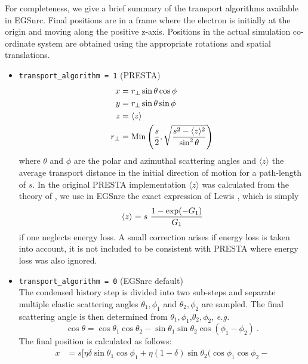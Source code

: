 For completeness, we give a brief summary of the transport
algorithms available in EGSnrc. Final positions are in a frame
where the electron is initially at the origin and moving
along the positive z-axis. Positions in the actual simulation
co-ordinate system are obtained using the appropriate
rotations and spatial translations.
\begin{itemize}
\item
{\tt trans\-port\_algo\-rithm = 1} (PRESTA)
\begin{equation}
\label{PRESTA}
\begin{split}
x &= r_\perp \sin \theta \cos \phi \\
y &= r_\perp \sin \theta \sin \phi \\
z &= \langle z \rangle \\
r_\perp &= \mbox{Min}\left({s \over 2},\sqrt{{s^2 - \langle z \rangle^2 \over
\sin^2 \theta}} \right)
\end{split}
\end{equation}
where $\theta$ and $\phi$ are the polar and azimuthal scattering
angles and $\langle z \rangle$ the average transport distance
in the initial direction of motion for a path-length of $s$.
In the original PRESTA implementation $\langle z \rangle$
was calculated from the theory of \Mol, we use in EGSnrc the
exact expression of Lewis \cite{Le50}, which is simply
\begin{equation}
\langle z \rangle = s~{1 - \exp(-G_1) \over G_1}
\end{equation}
if one neglects energy loss. A small correction arises
if energy loss is taken into account, it is not included
to be consistent with PRESTA where energy loss was also ignored.
\item {\tt trans\-port\_algo\-rithm = 0} (EGSnrc default) \hfill \\
The condensed history step is divided into two sub-steps and
separate multiple elastic scattering angles $\theta_1,\phi_1$ and
$\theta_2,\phi_2$ are sampled. The final scattering angle
is then determined from $\theta_1,\phi_1$,$\theta_2,\phi_2$, {\em e.g.}
\begin{equation}
\cos \theta = \cos \theta_1 \cos \theta_2 - \sin \theta_1 \sin \theta_2
\cos(\phi_1 - \phi_2)~.
\end{equation}
The final position is calculated as follows:
\begin{equation}
\label{egsnrc_algorithm}
\begin{split}
x & = s \Big[ \eta \delta \sin \theta_1 \cos \phi_1 +
\eta (1 - \delta) \sin \theta_2 ( \cos \phi_1 \cos \phi_2 -

\end{split}
\end{equation}
\end{itemize}

